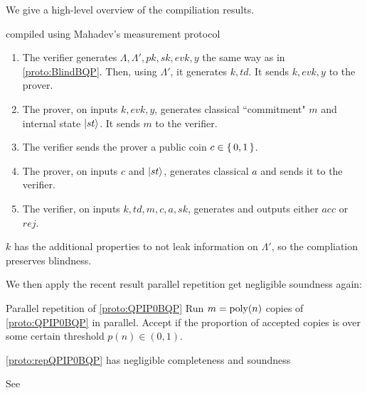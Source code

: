 We give a high-level overview of the compiliation results. 

\begin{protocol}{ compiled using Mahadev's measurement protocol }
	\label{proto:QPIP0BQP}
	\begin{enumerate}
		\item The verifier generates $\Lambda, \Lambda', pk, sk, evk, y$ the same way as in \cref{proto:BlindBQP}. 
			Then, using $\Lambda'$, it generates $k, td$.
			It sends $k, evk, y$ to the prover.
		\item The prover, on inputs $k, evk, y$, generates classical ``commitment" $m$ and internal state $\ket{st}$.
			It sends $m$ to the verifier.
		\item The verifier sends the prover a public coin $c\in\set{0,1}$.
		\item The prover, on inputs $c$ and $\ket{st}$, generates classical $a$ and sends it to the verifier.
		\item The verifier, on inputs $k, td, m, c, a, sk$, generates and outputs either $acc$ or $rej$.
	\end{enumerate}
\end{protocol}


$k$ has the additional properties to not leak information on $\Lambda'$, so the compliation preserves blindness. 

We then apply the recent result parallel repetition get negligible soundness again:

\begin{protocol}{Parallel repetition of \cref{proto:QPIP0BQP}}
	\label{proto:repQPIP0BQP}
	Run $m=\operatorname*{\operatorname{poly}}(n)$ copies of \cref{proto:QPIP0BQP} in parallel. Accept if the proportion of accepted copies is over some certain threshold $p(n)\in(0, 1)$.

\end{protocol}

\begin{thm}
	\cref{proto:repQPIP0BQP} has negligible completeness and soundness
\end{thm}
\begin{prf}
	See \cite{parallelrep} 
\end{prf}

